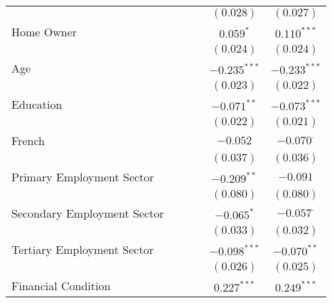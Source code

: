 \begin{center}
\begin{tiny}
\begin{longtable}{l@{} c@{} c@{} c@{} c@{} c@{}}
                                        &                &                &                & $(0.028)$      & $(0.027)$        \\
\quad Home Owner                        &                &                &                & $0.059^{*}$    & $0.110^{***}$    \\
                                        &                &                &                & $(0.024)$      & $(0.024)$        \\
\quad Age                               &                &                &                & $-0.235^{***}$ & $-0.233^{***}$   \\
                                        &                &                &                & $(0.023)$      & $(0.022)$        \\
\quad Education                         &                &                &                & $-0.071^{**}$  & $-0.073^{***}$   \\
                                        &                &                &                & $(0.022)$      & $(0.021)$        \\
\quad French                            &                &                &                & $-0.052$       & $-0.070^{\cdot}$ \\
                                        &                &                &                & $(0.037)$      & $(0.036)$        \\
\quad Primary Employment Sector         &                &                &                & $-0.209^{**}$  & $-0.091$         \\
                                        &                &                &                & $(0.080)$      & $(0.080)$        \\
\quad Secondary Employment Sector       &                &                &                & $-0.065^{*}$   & $-0.057^{\cdot}$ \\
                                        &                &                &                & $(0.033)$      & $(0.032)$        \\
\quad Tertiary Employment Sector        &                &                &                & $-0.098^{***}$ & $-0.070^{**}$    \\
                                        &                &                &                & $(0.026)$      & $(0.025)$        \\
\quad Financial Condition               &                &                &                & $0.227^{***}$  & $0.249^{***}$    \\

\end{longtable}
\end{tiny}
\end{center}
